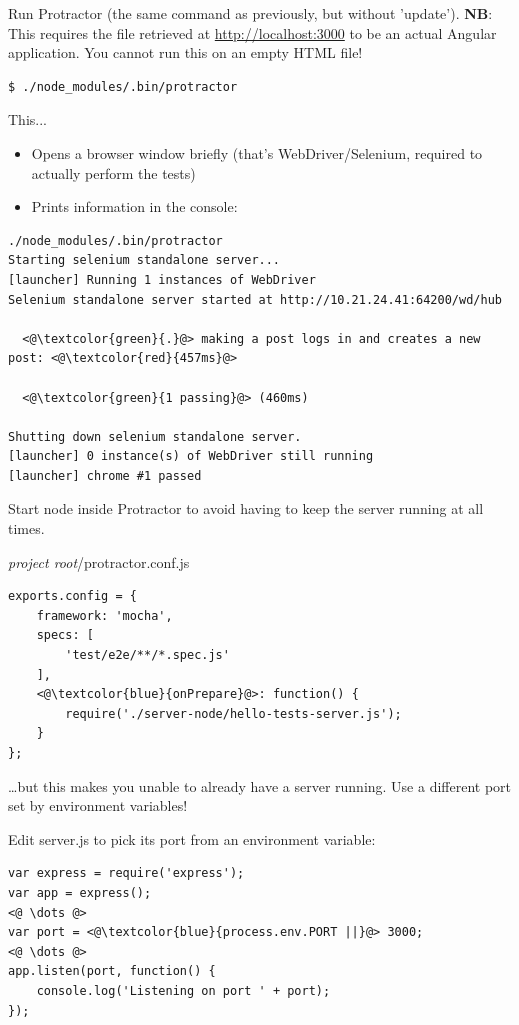 \documentclass[british]{article}
\begin{document}
Run Protractor (the same command as previously, but without 'update'). \textbf{NB}: This requires the file retrieved at \url{http://localhost:3000} to be an actual Angular application. You cannot run this on an empty HTML file!

\begin{lstlisting}
$ ./node_modules/.bin/protractor    
\end{lstlisting}

This...
\begin{itemize}
  \item Opens a browser window briefly (that's WebDriver/Selenium, required to actually perform the tests)
  \item Prints information in the console:
\end{itemize}

\begin{lstlisting}
./node_modules/.bin/protractor
Starting selenium standalone server...
[launcher] Running 1 instances of WebDriver
Selenium standalone server started at http://10.21.24.41:64200/wd/hub

  <@\textcolor{green}{.}@> making a post logs in and creates a new post: <@\textcolor{red}{457ms}@>

  <@\textcolor{green}{1 passing}@> (460ms)

Shutting down selenium standalone server.
[launcher] 0 instance(s) of WebDriver still running
[launcher] chrome #1 passed    
\end{lstlisting}

Start node inside Protractor to avoid having to keep the server running at all times.

\textit{project root}/protractor.conf.js
\begin{lstlisting}
exports.config = {
    framework: 'mocha',
    specs: [
        'test/e2e/**/*.spec.js'
    ],
    <@\textcolor{blue}{onPrepare}@>: function() {
        require('./server-node/hello-tests-server.js');
    }
};
\end{lstlisting}

\dots but this makes you unable to already have a server running. Use a different port set by environment variables!

Edit server.js to pick its port from an environment variable:

\begin{lstlisting}
var express = require('express');
var app = express();
<@ \dots @>
var port = <@\textcolor{blue}{process.env.PORT ||}@> 3000;
<@ \dots @>
app.listen(port, function() {
    console.log('Listening on port ' + port);
});
\end{lstlisting}
\end{document}
